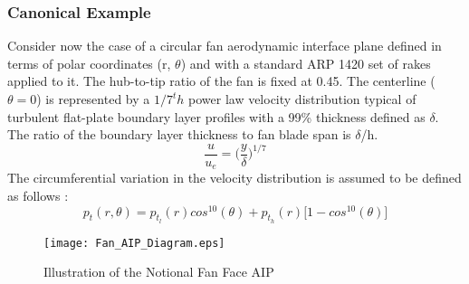 			\subsubsection{Canonical Example}
				Consider now the case of a circular fan aerodynamic interface plane defined in terms of polar coordinates (r, $\theta$) and with a standard ARP 1420 set of rakes applied to it. The hub-to-tip ratio of the fan is fixed at 0.45. The centerline ($\theta = 0$) is represented by a $1/7^th$ power law velocity distribution typical of turbulent flat-plate boundary layer profiles with a 99\% thickness defined as $\delta$.  The ratio of the boundary layer thickness to fan blade span is $\delta$/h.
				\begin{equation}
					\frac{u}{u_e} = \Big(\frac{y}{\delta}\Big)^{1/7}
					\label{1/7th_Power_Law}
				\end{equation}%
				The circumferential variation in the velocity distribution is assumed to be defined as follows \cite{RodriguezThesis}:
				\begin{equation}
					p_t(r, \theta) = p_{t_l}(r)cos^{10}(\theta)+p_{t_h}(r)\Big[1-cos^{10}(\theta)\Big]
					\label{2D_Circumferential_Mapping}
				\end{equation}%
				\begin{figure}[htp]
					\centering
					\texttt{[image: Fan\_AIP\_Diagram.eps]}
					\caption{Illustration of the Notional Fan Face AIP}
					\label{Delta_PRS_Diagram}
				\end{figure}

